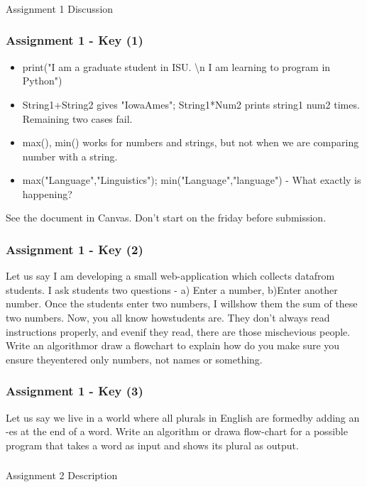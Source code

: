 \documentclass{beamer}
\begin{document}
\begin{frame}
\frametitle{}
\begin{center}
Assignment 1 Discussion
\end{center}
\end{frame}

\begin{frame}%
\frametitle{Assignment 1 - Key (1)}
\begin{itemize}
\item print("I am a graduate student in ISU. \textbackslash n I am learning to program in Python") \pause
\item String1+String2 gives "IowaAmes"; String1*Num2 prints string1 num2 times. Remaining two cases fail. \pause
\item max(), min() works for numbers and strings, but not when we are comparing number with a string. \pause
\item max("Language","Linguistics"); min("Language","language") - What exactly is happening?
\end{itemize}
See the document in Canvas. Don't start on the friday before submission. 
\end{frame}

\begin{frame}
\frametitle{Assignment 1 - Key (2)}
\small Let us say I am developing a small web-application which collects datafrom students. I ask students two questions - a) Enter a number, b)Enter another number. Once the students enter two numbers, I willshow them the sum of these two numbers. Now, you all know howstudents are. They don’t always read instructions properly, and evenif they read, there are those mischevious people. Write an algorithmor draw a flowchart to explain how do you make sure you ensure theyentered only numbers, not names or something.
\end{frame}

\begin{frame}
\frametitle{Assignment 1 - Key (3)}
\small Let us say we live in a world where all plurals in English are formedby adding an -es at the end of a word. Write an algorithm or drawa flow-chart for a possible program that takes a word as input and shows its plural as output.
\end{frame}

\begin{frame}
\frametitle{}
\begin{center}
Assignment 2 Description
\end{center}
\end{frame}
\end{document}
